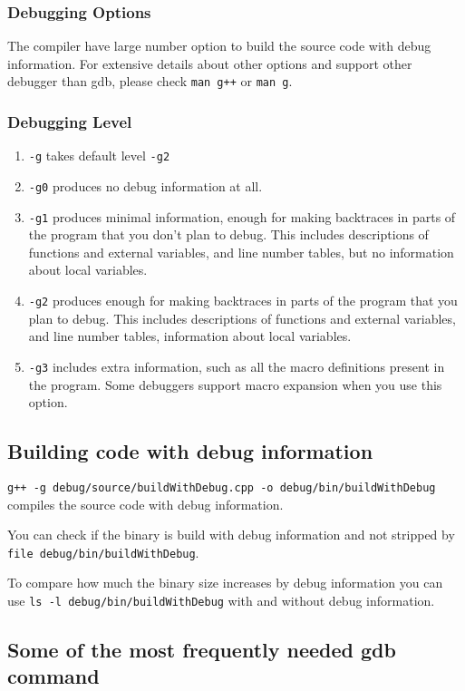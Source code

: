 \subsubsection{Debugging Options}
The compiler have large number option to build the source code with debug information.
For extensive details about other options and support other debugger than gdb, please check \texttt{man g++} or \texttt{man g}.

\subsubsection{Debugging Level}
\begin{enumerate}
  \item \texttt{-g} takes default level \texttt{-g2}
  \item \texttt{-g0} produces no debug information at all.
  \item \texttt{-g1} produces minimal information, enough for making backtraces in parts of the program that you don't plan to debug.  This includes descriptions of functions and external variables, and line number tables, but no information about local variables.
  \item \texttt{-g2} produces enough for making backtraces in parts of the program that you  plan to debug.  This includes descriptions of functions and external variables, and line number tables, information about local variables.
  \item \texttt{-g3} includes extra information, such as all the macro definitions present in the program.  Some debuggers support macro expansion when you use this option.
\end{enumerate}

\subsection{Building code with debug information}
\texttt{g++ -g debug/source/buildWithDebug.cpp -o debug/bin/buildWithDebug} compiles the source code with debug information.


You can check if the binary is build with debug information and not stripped by \texttt{file debug/bin/buildWithDebug}.

To compare how much the binary size increases by debug information you can use \texttt{ls -l debug/bin/buildWithDebug} with and without debug information.

\subsection{Some of the most frequently needed gdb command}

